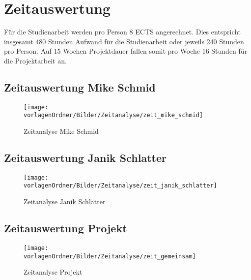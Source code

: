 \documentclass[]{subfiles}
\begin{document}
\section{Zeitauswertung}
Für die Studienarbeit werden pro Person 8 ECTS angerechnet.
Dies entspricht insgesamt 480 Stunden Aufwand für die Studienarbeit oder 
jeweils 240 Stunden pro Person.
Auf 15 Wochen Projektdauer fallen somit pro Woche 16 Stunden für die Projektarbeit an.

\subsection{Zeitauswertung Mike Schmid}
\begin{figure}[h!]
    \begin{center}
        \texttt{[image: \\vorlagenOrdner/Bilder/Zeitanalyse/zeit\_mike\_schmid]}
    \end{center}
    \caption{Zeitanalyse Mike Schmid}
\end{figure}

\subsection{Zeitauswertung Janik Schlatter}
\begin{figure}[h!]
    \begin{center}
        \texttt{[image: \\vorlagenOrdner/Bilder/Zeitanalyse/zeit\_janik\_schlatter]}
    \end{center}
    \caption{Zeitanalyse Janik Schlatter}
\end{figure}

\newpage

\subsection{Zeitauswertung Projekt}
\begin{figure}[h!]
    \begin{center}
        \texttt{[image: \\vorlagenOrdner/Bilder/Zeitanalyse/zeit\_gemeinsam]}
    \end{center}
    \caption{Zeitanalyse Projekt}
\end{figure}
\end{document}
